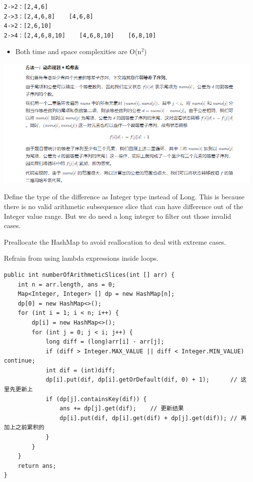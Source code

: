 \documentclass[9pt, b5paaper]{book}
\begin{document}
\begin{verbatim}
2->2：[2,4,6]
2->3：[2,4,6,8]    [4,6,8]
4->2：[2,6,10]
2->4：[2,4,6,8,10]    [4,6,8,10]    [6,8,10]
\end{verbatim}
\begin{itemize}
\item Both time and space complexities are O(n$^{\text{2}}$)
\end{itemize}

\includegraphics[width=.9\linewidth]{./pic/arithslice.png}

Define the type of the difference as Integer type instead of Long. This is because there is no valid arithmetic subsequence slice that can have difference out of the Integer value range. But we do need a long integer to filter out those invalid cases.

Preallocate the HashMap to avoid reallocation to deal with extreme cases.

Refrain from using lambda expressions inside loops.

\begin{verbatim}
public int numberOfArithmeticSlices(int [] arr) {
    int n = arr.length, ans = 0;
    Map<Integer, Integer> [] dp = new HashMap[n];
    dp[0] = new HashMap<>();
    for (int i = 1; i < n; i++) {
        dp[i] = new HashMap<>();
        for (int j = 0; j < i; j++) {
            long diff = (long)arr[i] - arr[j];
            if (diff > Integer.MAX_VALUE || diff < Integer.MIN_VALUE) continue;
            int dif = (int)diff;
            dp[i].put(dif, dp[i].getOrDefault(dif, 0) + 1);      // 这里先更新上
            if (dp[j].containsKey(dif)) {
                ans += dp[j].get(dif);    // 更新结果
                dp[i].put(dif, dp[i].get(dif) + dp[j].get(dif)); // 再加上之前累积的
            }
        }
    }
    return ans;
}
\end{verbatim}
\end{document}
